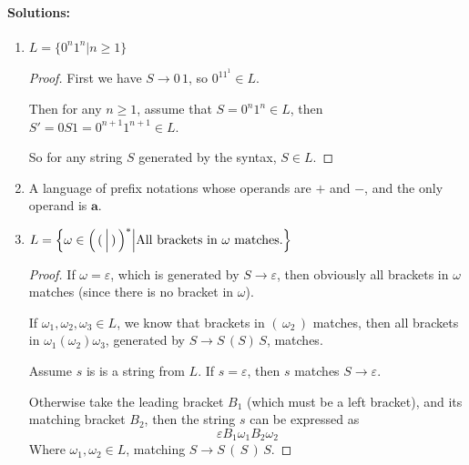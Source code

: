 \documentclass[scheme=plain,12pt]{ctexart}
\begin{document}
    \paragraph*{Solutions:}
    \begin{enumerate}
        \item $L = \{0^n1^n | n \geq 1\}$
        \begin{proof}
            First we have $S \to 0\,1$, so $0^11^1 \in L$.

            Then for any $n \geq 1$, assume that $S = 0^n1^n \in L$, then $S' = 0S1 = 0^{n+1}1^{n+1} \in L$.

            So for any string $S$ generated by the syntax, $S \in L$.
        \end{proof}
        \item A language of prefix notations whose operands are $+$ and $-$, and the only operand is $\mathbf{a}$.
        \item $L = \left\{\omega\in\Bigl(\,(\,\Big|\,)\,\Bigr)^* \Big| \text{All brackets in }\omega\text{ matches.}\right\}$
        \begin{proof}
            If $\omega = \varepsilon$, which is generated by $S \to \varepsilon$, then obviously all brackets in $\omega$ matches (since there is no bracket in $\omega$).

            If $\omega_1, \omega_2, \omega_3 \in L$, we know that brackets in $(\,\omega_2\,)$ matches, then all brackets in $\omega_1(\omega_2)\omega_3$, generated by $S \to S\,(S)\,S$, matches.

            Assume $s$ is is a string from $L$. If $s = \varepsilon$, then $s$ matches $S \to \varepsilon$.

            Otherwise take the leading bracket $B_1$ (which must be a left bracket), and its matching bracket $B_2$, then the string $s$ can be expressed as
            \[\varepsilon B_1 \omega_1 B_2 \omega_2\]
            Where $\omega_1, \omega_2 \in L$, matching $S \to S\,(\,S\,)\,S$.


\end{proof}
\end{enumerate}
\end{document}
